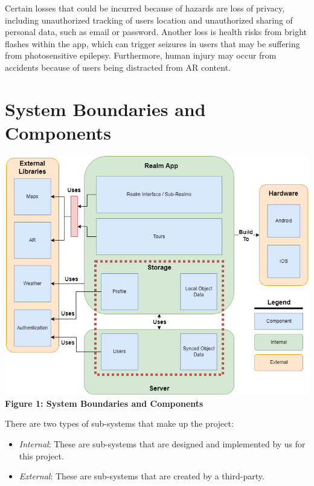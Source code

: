 \documentclass{article}
\begin{document}
Certain losses that could be incurred because of hazards are loss of privacy, including unauthorized tracking of users location and unauthorized sharing of personal data, such as email or password. Another loss is health risks from bright flashes within the app, which can trigger seizures in users that may be suffering from photosensitive epilepsy. Furthermore, human injury may occur from accidents because of users being distracted from AR content.

\section{System Boundaries and Components}

\begin{center}
    \includegraphics[scale=0.5]{sys_bound_comp.png} \\
    \textbf{Figure 1: System Boundaries and Components}
\end{center}

There are two types of sub-systems that make up the project:
\begin{itemize}
    \item \emph{Internal}: These are sub-systems that are designed and implemented by us for this project.
    \item \emph{External}: These are sub-systems that are created by a third-party.
\end{itemize}
\end{document}
